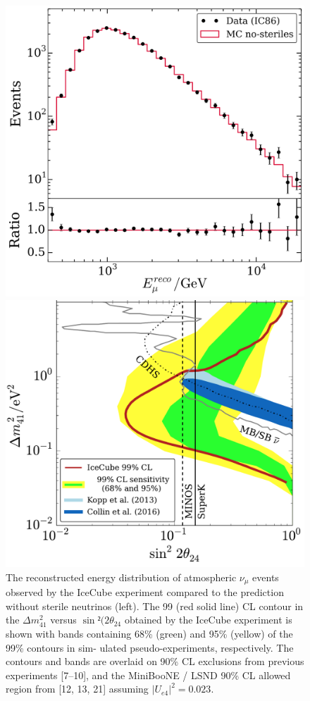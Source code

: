 \begin{figure}[htbp]
\begin{minipage}[c]{.46\linewidth}
   	      \includegraphics[width=0.9\linewidth]{figures/EnergyDist-2.png}
   \end{minipage} \hfill
   \begin{minipage}{.46\linewidth}
      \includegraphics[width=0.9\linewidth]{figures/icecube-sterile-crop.pdf}
   \end{minipage}
    \caption{The reconstructed energy distribution of atmospheric $\nu_\mu$ events observed by the IceCube experiment compared to the prediction without sterile neutrinos (left). 
The 99%
(red solid line) CL contour in the $\Delta m^2_{41}$ versus $\sin² (2 \theta_{24}$ obtained by the IceCube experiment is shown with bands containing
68\% (green) and 95\% (yellow) of the 99\% contours in sim-
ulated pseudo-experiments, respectively. The contours and
bands are overlaid on 90\% CL exclusions from previous experiments [7–10], and the MiniBooNE / LSND 90\% CL allowed
region from [12, 13, 21] assuming $|U_{e4}|^2 = 0.023$.  }
 \label{fig:icecube-sterile}
\end{figure}

